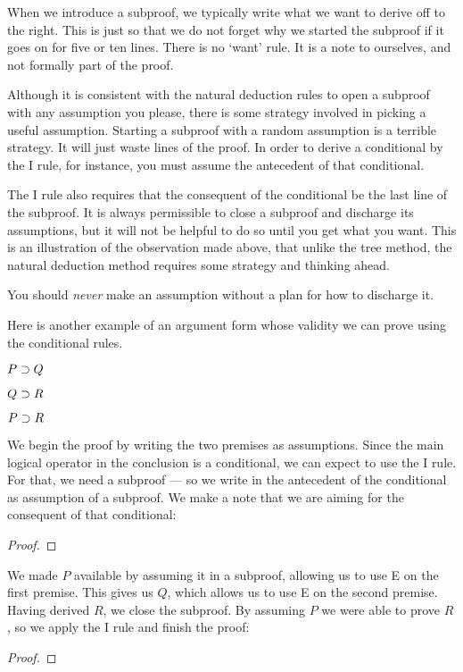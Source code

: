 When we introduce a subproof, we typically write what we want to derive off to the right. This is just so that we do not forget why we started the subproof if it goes on for five or ten lines. There is no `want' rule. It is a note to ourselves, and not formally part of the proof.

Although it is consistent with the natural deduction rules to open a subproof with any assumption you please, there is some strategy involved in picking a useful assumption. Starting a subproof with a random assumption is a terrible strategy. It will just waste lines of the proof. In order to derive a conditional by the {\eif}I rule, for instance, you must assume the antecedent of that conditional.

The {\eif}I rule also requires that the consequent of the conditional be the last line of the subproof. It is always permissible to close a subproof and discharge its assumptions, but it will not be helpful to do so until you get what you want. This is an illustration of the observation made above, that unlike the tree method, the natural deduction method requires some strategy and thinking ahead.

You should \emph{never} make an assumption without a plan for how to discharge it.

Here is another example of an argument form whose validity we can prove using the conditional rules.


\begin{earg}
\item[] $P \supset Q$
\item[] $Q \supset R$
\item[\therefore] $P \supset R$
\end{earg}
We begin the proof by writing the two premises as assumptions. Since the main logical operator in the conclusion is a conditional, we can expect to use the {\eif}I rule. For that, we need a subproof --- so we write in the antecedent of the conditional as assumption of a subproof. We make a note that we are aiming for the consequent of that conditional:

\begin{proof}
	\open
		 
	\close
\end{proof}

We made $P$ available by assuming it in a subproof, allowing us to use {\eif}E on the first premise. This gives us $Q$, which allows us to use {\eif}E on the second premise. Having derived $R$, we close the subproof. By assuming $P$ we were able to prove $R$, so we apply the {\eif}I rule and finish the proof:
\label{HSproof}
\begin{proof}
	\open
	\close
\end{proof}




